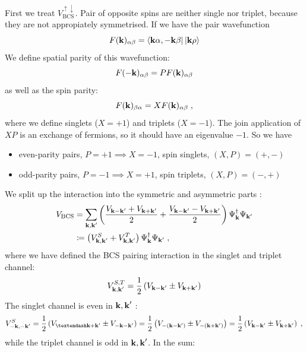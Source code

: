 \documentclass[../main.tex]{subfiles}
\begin{document}
First we treat \(V_{\text{BCS}}^{\uparrow \downarrow}\).
Pair of opposite spins are neither single nor triplet, because they are not appropiately symmetrised.
If we have the pair wavefunction
\begin{equation}
    F(\bm{\mathrm{k}})_{\alpha \beta} = \bra{\bm{\mathrm{k}}\alpha, -\bm{\mathrm{k}}\beta} \ket{\bm{\mathrm{k}}\rho}
\end{equation}
We define spatial parity of this wavefunction:
\begin{equation}
    F(-\bm{\mathrm{k}})_{\alpha \beta} = P F(\bm{\mathrm{k}})_{\alpha \beta}
\end{equation}
as well as the spin parity:
\begin{equation}
    F(\bm{\mathrm{k}})_{\beta \alpha} = X F(\bm{\mathrm{k}})_{\alpha \beta}
    \;,
\end{equation}
where we define singlets (\(X=+1\)) and triplets (\(X=-1\)).
The join application of \(XP\) is an exchange of fermions, so it should have an eigenvalue \(-1\).
So we have
\begin{itemize}
    \item even-parity pairs, \(P=+1 \implies X=-1\), spin singlets, \((X, P) = (+, -)\)
    \item odd-parity pairs, \(P=-1 \implies X=+1\), spin triplets, \((X, P) = (-, +)\)
\end{itemize}
We split up the interaction into the symmetric and asymmetric parts 
:
\begin{align}
    V_{\text{BCS}} &= \sum_{\bm{\mathrm{k}}, \bm{\mathrm{k}}^{\prime}} \left(\frac{V_{\bm{\mathrm{k}} - \bm{\mathrm{k}}^{\prime}} + V_{\bm{\mathrm{k}} + \bm{\mathrm{k}}^{\prime}}}{2} + \frac{V_{\bm{\mathrm{k}} - \bm{\mathrm{k}}^{\prime}} - V_{\bm{\mathrm{k}} + \bm{\mathrm{k}}^{\prime}}}{2}\right) \Psi_{\bm{\mathrm{k}}}^{\dagger} \Psi_{\bm{\mathrm{k}}^{\prime}} \\
    &\coloneq \left( V_{\bm{\mathrm{k}}, \bm{\mathrm{k}}^{\prime}}^S + V_{\bm{\mathrm{k}}, \bm{\mathrm{k}}^{\prime}}^T \right) \Psi_{\bm{\mathrm{k}}}^{\dagger} \Psi_{\bm{\mathrm{k}}^{\prime}}
    \;,
\end{align}
where we have defined the BCS pairing interaction in the singlet and triplet channel:
\begin{equation}
    V_{\bm{\mathrm{k}}, \bm{\mathrm{k}}^{\prime}}^{S, T} = \frac{1}{2} \left( V_{\bm{\mathrm{k}} - \bm{\mathrm{k}}^{\prime}} \pm V_{\bm{\mathrm{k}} + \bm{\mathrm{k}}^{\prime}} \right)
\end{equation}
The singlet channel is even in \(\bm{\mathrm{k}}, \bm{\mathrm{k}}^{\prime}\) :
\begin{align}
    V_{-\vb{k}, -\vb{k}^{\prime}}^{S} = \frac{1}{2} \left( V_{–\vb{k} + \vb{k}^{\prime}} \pm V_{-\vb{k} - \vb{k}^{\prime}} \right)
    = \frac{1}{2} \left( V_{-(\vb{k} - \vb{k}^{\prime})} \pm V_{-(\vb{k} + \vb{k}^{\prime})} \right)
    = \frac{1}{2} \left( V_{\vb{k} - \vb{k}^{\prime}} \pm V_{\vb{k} + \vb{k}^{\prime}} \right)
    \;,
\end{align}
while the triplet channel is odd in \(\bm{\mathrm{k}}, \bm{\mathrm{k}}^{\prime}\).
In the sum:
\end{document}
